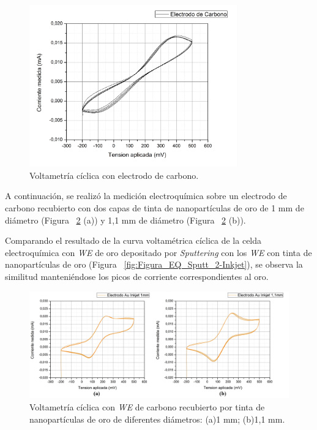 \begin{figure}[H]
  \centering
    \includegraphics[width=0.8\textwidth]{Figuras/Figura_EQ_Carbono}
  \caption{Voltametría cíclica con electrodo de carbono.}
  \label{fig:Figura_EQ_Carbono}
\end{figure}
A continuación, se realizó la medición electroquímica sobre un electrodo de carbono recubierto con dos capas de tinta de nanopartículas de oro de 1 mm de diámetro (Figura ~\ref{fig:Figura_EQ_Oro_Inkjet_Ambos} (a)) y 1,1 mm de diámetro (Figura ~\ref{fig:Figura_EQ_Oro_Inkjet_Ambos} (b)).

Comparando el resultado de la curva voltamétrica cíclica de la celda electroquímica con \emph{WE} de oro depositado por \textit{Sputtering} con los \emph{WE} con tinta de nanopartículas de oro (Figura ~\ref{fig:Figura_EQ_Sputt_2-Inkjet}), se observa la similitud manteniéndose los picos de corriente correspondientes al oro.

\begin{figure}[H]
  \centering
    \includegraphics[width=1\textwidth]{Figuras/Figura_EQ_Oro_Inkjet_Ambos}
  \caption{Voltametría cíclica con \emph{WE} de carbono recubierto por tinta de nanopartículas de oro de diferentes diámetros: (a)1 mm; (b)1,1 mm.}
  \label{fig:Figura_EQ_Oro_Inkjet_Ambos}
\end{figure}

